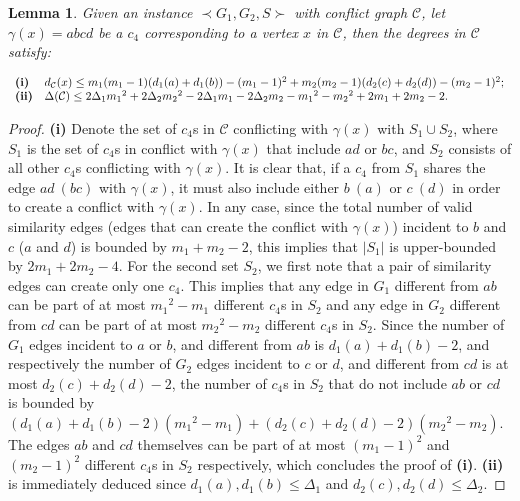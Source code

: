 \documentclass[final]{dmtcs-episciences}
\newtheorem{lemma}[theorem]{Lemma}
\begin{document}
\begin{lemma}
\label{deglemma}
Given an instance $\prec G_1,G_2,S \succ$ with conflict graph $\mathcal{C}$, let $\gamma(x)=abcd$ be a $c_4$ corresponding to a vertex $x$ in  $\mathcal{C}$, then the degrees in $\mathcal{C}$ satisfy:

\noindent
$ \begin{array}{ll}
 {\rm\textbf{(i)}} &
d_{\mathcal{C}}(x) \leq  m_1(m_1-1)(d_1(a)+d_1(b))-(m_1-1)^2 + m_2(m_2-1)(d_2(c)+d_2(d))-(m_2-1)^2;\\
 {\rm\textbf{(ii)}} & \Delta(\mathcal{C})\leq  2\Delta_1{m_1}^2+2\Delta_2{m_2}^2-2\Delta_1m_1-2\Delta_2m_2-{m_1}^2-{m_2}^2+2m_1+2m_2-2.
 \end{array} $
\end{lemma}
\begin{proof} 
\textbf{(i)}
Denote the set of 
$c_4$s in $\mathcal{C}$ 
conflicting with $\gamma(x)$ 
with $S_1\cup S_2$, where $S_1$ is the set of $c_4$s in conflict with $\gamma(x)$ that include $ad$ or $bc$, and $S_2$ consists of all other $c_4$s conflicting with $\gamma(x)$.  
It is clear that, if a $c_4$ from $S_1$ shares the edge $ad\ (bc)$ with $\gamma(x)$, it must also include either $b\ (a)$ or $c\ (d)$ in order to create a conflict with $\gamma(x)$. In any case, since the total number of valid similarity edges (edges that can create the conflict with $\gamma(x)$) incident to $b$ and $c$ ($a$ and $d$) is bounded by $m_1+m_2-2$, this implies that $|S_1|$ is upper-bounded by $2m_1+2m_2-4$. 
For the second set $S_2$, we first note that a pair of similarity edges can create only one $c_4$. 
This implies that any edge in $G_1$
different from $ab$
can be part of at most ${m_1}^2-m_1$ different $c_4$s in $S_2$ and any edge in $G_2$ different from $cd$ can be part of at most ${m_2}^2-m_2$
different $c_4$s in $S_2$.
Since the number of $G_1$ edges incident to $a$ or $b$, and different from $ab$ is 
 $d_1(a)+d_1(b)-2$, and respectively the number of $G_2$ edges incident to $c$ or $d$, and different from $cd$ is 
at most $d_2(c)+d_2(d)-2$, the number of $c_4$s in $S_2$ that do not include $ab$ or $cd$
is bounded by $(d_1(a)+d_1(b)-2)({m_1}^2-m_1)+(d_2(c)+d_2(d)-2)({m_2}^2-m_2)$.
The edges $ab$ and $cd$ themselves can be part of at most $(m_1-1)^2$ and $(m_2-1)^2$ different $c_4$s in $S_2$ respectively, which concludes the proof of \textbf{(i)}. \textbf{(ii)} is immediately deduced since  $d_1(a), d_1(b) \leq \Delta_1$ and $d_2(c), d_2(d) \leq \Delta_2$.
\end{proof}
\end{document}
